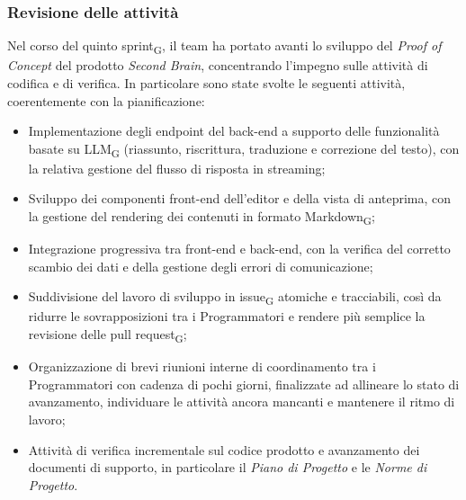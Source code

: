 ﻿\documentclass[a4paper, 10pt, colorlinks=true, linkcolor=black, urlcolor=blue, citecolor=blue, hidelinks]{article}
\begin{document}
\subsubsection{Revisione delle attività}
Nel corso del quinto sprint\textsubscript{G}, il team ha portato avanti lo sviluppo del \textit{Proof of Concept} del prodotto \textit{Second Brain}, concentrando l'impegno sulle attività di codifica e di verifica. In particolare sono state svolte le seguenti attività, coerentemente con la pianificazione:
\begin{itemize}
    \item Implementazione degli endpoint del back-end a supporto delle funzionalità basate su LLM\textsubscript{G} (riassunto, riscrittura, traduzione e correzione del testo), con la relativa gestione del flusso di risposta in streaming;
    \item Sviluppo dei componenti front-end dell'editor e della vista di anteprima, con la gestione del rendering dei contenuti in formato Markdown\textsubscript{G};
    \item Integrazione progressiva tra front-end e back-end, con la verifica del corretto scambio dei dati e della gestione degli errori di comunicazione;
    \item Suddivisione del lavoro di sviluppo in issue\textsubscript{G} atomiche e tracciabili, così da ridurre le sovrapposizioni tra i Programmatori e rendere più semplice la revisione delle pull request\textsubscript{G};
    \item Organizzazione di brevi riunioni interne di coordinamento tra i Programmatori con cadenza di pochi giorni, finalizzate ad allineare lo stato di avanzamento, individuare le attività ancora mancanti e mantenere il ritmo di lavoro;
    \item Attività di verifica incrementale sul codice prodotto e avanzamento dei documenti di supporto, in particolare il \textit{Piano di Progetto} e le \textit{Norme di Progetto}.
\end{itemize}
\end{document}
